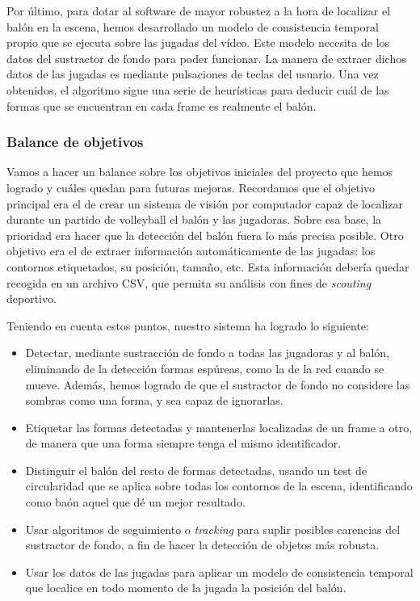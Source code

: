 Por último, para dotar al software de mayor robustez a la hora de localizar el balón en la escena, hemos desarrollado un modelo de consistencia temporal propio que se ejecuta sobre las jugadas del vídeo. Este modelo necesita de los datos del sustractor de fondo para poder funcionar. La manera de extraer dichos datos de las jugadas es mediante pulsaciones de teclas del usuario. Una vez obtenidos, el algoritmo sigue una serie de heurísticas para deducir cuál de las formas que se encuentran en cada frame es realmente el balón.

\subsubsection*{Balance de objetivos}
Vamos a hacer un balance sobre los objetivos iniciales del proyecto que hemos logrado y cuáles quedan para futuras mejoras. Recordamos que el objetivo principal era el de crear un sistema de visión por computador capaz de localizar durante un partido de volleyball el balón y las jugadoras. Sobre esa base, la prioridad era hacer que la detección del balón fuera lo más precisa posible. Otro objetivo era el de extraer información automáticamente de las jugadas: los contornos etiquetados, su posición, tamaño, etc. Esta información debería quedar recogida en un archivo CSV, que permita su análisis con fines de \textit{scouting} deportivo.

Teniendo en cuenta estos puntos, nuestro sistema ha logrado lo siguiente:
\begin{itemize}
    \item Detectar, mediante sustracción de fondo a todas las jugadoras y al balón, eliminando de la detección formas espúreas, como la de la red cuando se mueve. Además, hemos logrado de que el sustractor de fondo no considere las sombras como una forma, y sea capaz de ignorarlas.
    \item Etiquetar las formas detectadas y mantenerlas localizadas de un frame a otro, de manera que una forma siempre tenga el mismo identificador.
    \item Distinguir el balón del resto de formas detectadas, usando un test de circularidad que se aplica sobre todas los contornos de la escena, identificando como baón aquel que dé un mejor resultado.
    \item Usar algoritmos de seguimiento o \textit{tracking} para suplir posibles carencias del sustractor de fondo, a fin de hacer la detección de objetos más robusta.
    \item Usar los datos de las jugadas para aplicar un modelo de consistencia temporal que localice en todo momento de la jugada la posición del balón.
\end{itemize}


